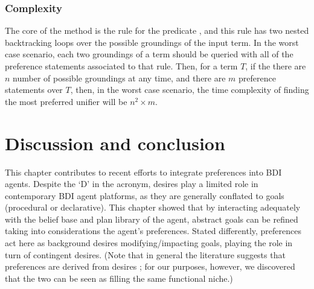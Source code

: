 \subsubsection*{Complexity}
The core of the method is the rule for the predicate , and this rule has two nested backtracking loops over the possible groundings of the input term. In the worst case scenario, each two groundings of a term should be queried with all of the preference statements associated to that rule. Then, for a term $T$, if the there are $n$ number of possible groundings at any time, and there are $m$ preference statements over $T$, then, in the worst case scenario, the time complexity of finding the most preferred unifier will be $n^2 \times m$. 




\section{Discussion and conclusion}
\label{sec:discuss}
This chapter contributes to recent efforts to integrate preferences into BDI agents. Despite the `D' in the acronym, desires play a limited role in contemporary BDI agent platforms, as they are generally conflated to goals (procedural or declarative). This chapter showed that by interacting adequately with the belief base and plan library of the agent, abstract goals can be refined taking into considerations the agent's preferences. Stated differently, preferences act here as background desires modifying/impacting goals, playing the role in turn of contingent desires. (Note that in general the literature suggests that preferences are
derived from desires \cite{Lorini2017}; for our purposes, however, we discovered that the two can be seen as filling the same functional niche.) 

